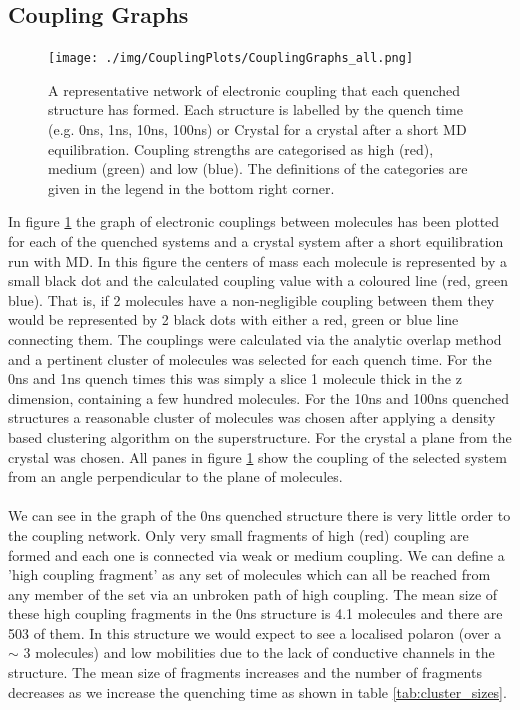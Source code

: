 \subsection{Coupling Graphs}
\label{sect:couplGraphs}
\begin{figure}[h]
	\texttt{[image: ./img/CouplingPlots/CouplingGraphs\_all.png]}
	\caption{\label{fig:crystalCouplingGraph}A representative network of electronic coupling that each quenched structure has formed. Each structure is labelled by the quench time (e.g. 0ns, 1ns, 10ns, 100ns) or Crystal for a crystal after a short MD equilibration. Coupling strengths are categorised as high (red), medium (green) and low (blue). The definitions of the categories are given in the legend in the bottom right corner.}
\end{figure}
\noindent In figure \ref{fig:crystalCouplingGraph} the graph of electronic couplings between molecules has been plotted for each of the quenched systems and a crystal system after a short equilibration run with MD. In this figure the centers of mass each molecule is represented by a small black dot and the calculated coupling value with a coloured line (red, green blue). That is, if 2 molecules have a non-negligible coupling between them they would be represented by 2 black dots with either a red, green or blue line connecting them. The couplings were calculated via the analytic overlap method \cite{gajdos_ultrafast_2014} and a pertinent cluster of molecules was selected for each quench time. For the 0ns and 1ns quench times this was simply a slice 1 molecule thick in the z dimension, containing a few hundred molecules. For the 10ns and 100ns quenched structures a reasonable cluster of molecules was chosen after applying a density based clustering algorithm on the superstructure. For the crystal a plane from the crystal was chosen. All panes in figure \ref{fig:crystalCouplingGraph} show the coupling of the selected system from an angle perpendicular to the plane of molecules.
\\\\
We can see in the graph of the 0ns quenched structure there is very little order to the coupling network. Only very small fragments of high (red) coupling are formed and each one is connected via weak or medium coupling. We can define a 'high coupling fragment' as any set of molecules which can all be reached from any member of the set via an unbroken path of high coupling. The mean size of these high coupling fragments in the 0ns structure is 4.1 molecules and there are 503 of them. In this structure we would expect to see a localised polaron (over a $\sim$ 3 molecules) and low mobilities due to the lack of conductive channels in the structure. The mean size of fragments increases and the number of fragments decreases as we increase the quenching time as shown in table \ref{tab:cluster_sizes}.
